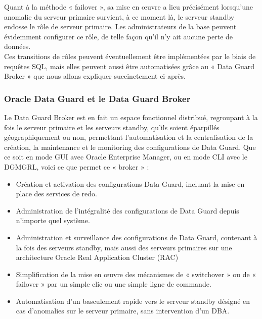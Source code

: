 \documentclass[12pt]{report}
\begin{document}
Quant à la méthode « failover », sa mise en œuvre a lieu précisément lorsqu'une
anomalie du serveur primaire survient, à ce moment là, le serveur standby
endosse le rôle de serveur primaire. Les administrateurs de la base peuvent
évidemment configurer ce rôle, de telle façon qu'il n'y ait  aucune perte de
données. \\

Ces transitions de rôles peuvent éventuellement être implémentées par le biais
de requêtes SQL, mais elles peuvent aussi être automatisées grâce au « Data
  Guard Broker » que nous allons expliquer succinctement ci-après. \\

\subsubsection{Oracle Data Guard et le Data Guard Broker}

Le Data Guard Broker est en fait un espace fonctionnel distribué, regroupant à
la fois le serveur primaire et les serveurs standby, qu'ils soient éparpillés
géographiquement ou non, permettant l'automatisation et la centralisation de la
création, la maintenance et le monitoring des configurations de Data Guard. Que
ce soit en mode GUI avec Oracle Enterprise Manager, ou en mode CLI avec le
DGMGRL, voici ce que permet ce « broker » :


\begin{itemize}
\item Création et activation des configurations Data Guard, incluant la mise en
  place des services  de redo.

\item Administration de l'intégralité des configurations de Data Guard depuis
  n'importe quel système.

\item Administration et surveillance des configurations de Data Guard, contenant
  à la fois des serveurs standby, mais aussi des serveurs primaires sur une
  architecture Oracle Real Application Cluster (RAC)

\item Simplification de la mise en œuvre des mécanismes de « switchover » ou de
  « failover » par un simple clic ou une simple ligne de commande.

\item Automatisation d'un basculement rapide vers le serveur standby désigné en
  cas d'anomalies sur le serveur primaire, sans intervention d'un DBA.
\end{itemize}
\end{document}
